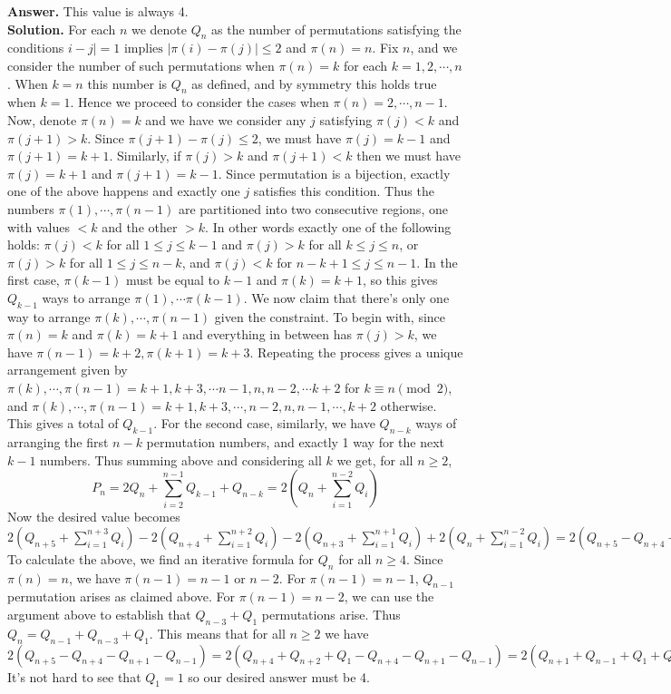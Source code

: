 \documentclass[11pt,a4paper]{article}
\newcommand{\<}{\langle}
\renewcommand{\>}{\rangle}
\begin{document}
\begin{enumerate}
	\textbf{Answer.} This value is always 4. \\
	\textbf{Solution.} For each $n$ we denote $Q_n$ as the number of permutations satisfying the conditions $i-j|=1\text{ implies }|\pi(i)-\pi(j)|\le 2$ and $\pi(n)=n$. Fix $n$, and we consider the number of such permutations when $\pi(n)=k$ for each $k=1, 2, \cdots , n$. When $k=n$ this number is $Q_n$ as defined, and by symmetry this holds true when $k=1$. Hence we proceed to consider the cases when $\pi(n)=2, \cdots , n-1$. Now, denote $\pi(n)=k$ and we have we consider any $j$ satisfying $\pi(j)<k$ and $\pi(j+1)>k$. Since $\pi(j+1)-\pi(j)\le 2$, we must have $\pi(j)=k-1$ and $\pi(j+1)=k+1$. Similarly, if $\pi(j)>k$ and $\pi(j+1)<k$ then we must have $\pi(j)=k+1$ and $\pi(j+1)=k-1$. Since permutation is a bijection, exactly one of the above happens and exactly one $j$ satisfies this condition. Thus the numbers $\pi(1), \cdots , \pi(n-1)$ are partitioned into two consecutive regions, one with values $<k$ and the other $>k$. In other words exactly one of the following holds: $\pi(j)<k$ for all $1\le j\le k-1$ and $\pi(j)>k$ for all $k\le j\le n$, or $\pi(j)>k$ for all $1\le j\le n-k$, and $\pi(j)<k$ for $n-k+1\le j\le n-1$. In the first case, $\pi(k-1)$ must be equal to $k-1$ and $\pi(k)=k+1$, so this gives $Q_{k-1}$ ways to arrange $\pi(1), \cdots \pi(k-1)$. We now claim that there's only one way to arrange $\pi(k), \cdots , \pi(n-1)$ given the constraint. To begin with, since $\pi(n)=k$ and $\pi(k)=k+1$ and everything in between has $\pi(j)>k$, we have 
	$\pi(n-1)=k+2, \pi(k+1)=k+3$. Repeating the process gives a unique arrangement given by 
	$\pi(k), \cdots , \pi(n-1)=k+1, k+3, \cdots n-1, n, n-2, \cdots k+2$ for $k\equiv n\pmod{2}$, and $\pi(k), \cdots , \pi(n-1)=k+1, k+3, \cdots , n-2, n, n-1, \cdots , k+2$ otherwise. This gives a total of $Q_{k-1}$. For the second case, similarly, we have $Q_{n-k}$ ways of arranging the first $n-k$ permutation numbers, and exactly 1 way for the next $k-1$ numbers. Thus summing above and considering all $k$ we get, for all $n\ge 2$,  
	\[P_n=2Q_n+\sum_{i=2}^{n-1}Q_{k-1}+Q_{n-k}=2(Q_n+\sum_{i=1}^{n-2} Q_i)\]
	Now the desired value becomes 
	$2(Q_{n+5}+\sum_{i=1}^{n+3} Q_i )- 2(Q_{n+4}+\sum_{i=1}^{n+2} Q_i)-2(Q_{n+3}+\sum_{i=1}^{n+1} Q_i)+2(Q_n+\sum_{i=1}^{n-2} Q_i)
	=2(Q_{n+5}-Q_{n+4}-Q_{n+1}-Q_{n-1})
	$
	To calculate the above, we find an iterative formula for $Q_n$ for all $n\ge 4$. Since $\pi(n)=n$, we have $\pi(n-1)=n-1$ or $n-2$. For $\pi(n-1)=n-1$, $Q_{n-1}$ permutation arises as claimed above. For $\pi(n-1)=n-2$, we can use the argument above to establish that $Q_{n-3}+Q_1$ permutations arise. Thus $Q_n=Q_{n-1}+Q_{n-3}+Q_1$. This means that for all $n\ge 2$ we have 
	$2(Q_{n+5}-Q_{n+4}-Q_{n+1}-Q_{n-1})
	=2(Q_{n+4}+Q_{n+2}+Q_1-Q_{n+4}-Q_{n+1}-Q_{n-1})
	=2(Q_{n+1}+Q_{n-1}+Q_1+Q_1-Q_{n+1}-Q_{n-1})
	=4Q_1.
	$
	It's not hard to see that $Q_1=1$ so our desired answer must be 4. 
	
\end{enumerate}
\end{document}
